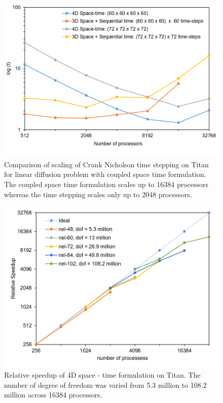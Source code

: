 \begin{figure}
    \centering
    \includegraphics[scale = 0.5]{figs/solve-time-comparison-titan-TS-ST-linear-basis.png}
    \caption{Comparison of scaling of Crank Nicholson time stepping on Titan for linear diffusion problem with coupled space time formulation. The coupled space time formulation scales up to 16384 processors whereas the time stepping scales only up to 2048 processors. }
    \label{fig:comparison_Titan_4D}
\end{figure}

\begin{figure}
    \centering
    \includegraphics[scale = 0.5]{figs/scaling-titan-LIN-linear-nel-var-speedup.png}
    \caption{Relative speedup  of 4D space - time formulation on Titan. The number of degree of freedom was varied from 5.3 million to 108.2 million across 16384 processors.}
    \label{fig:matrix_Titan_4D}
\end{figure}


